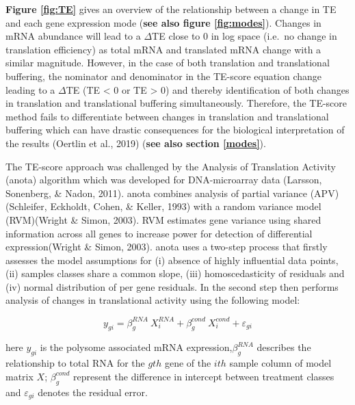 \documentclass[
  12pt,
  openany]{book}
\begin{document}
\textbf{Figure \ref{fig:TE}} gives an overview of the relationship between a change in TE and each gene expression mode (\textbf{see also figure \ref{fig:modes}}). Changes in mRNA abundance will lead to a \(\varDelta\)TE close to 0 in log space (i.e.~no change in translation efficiency) as total mRNA and translated mRNA change with a similar magnitude. However, in the case of both translation and translational buffering, the nominator and denominator in the TE-score equation change leading to a \(\varDelta\)TE (TE \textless{} 0 or TE \textgreater{} 0) and thereby identification of both changes in translation and translational buffering simultaneously. Therefore, the TE-score method fails to differentiate between changes in translation and translational buffering which can have drastic consequences for the biological interpretation of the results (Oertlin et al., 2019) (\textbf{see also section \ref{modes}}).

The TE-score approach was challenged by the Analysis of Translation Activity (anota) algorithm which was developed for DNA-microarray data (Larsson, Sonenberg, \& Nadon, 2011). anota combines analysis of partial variance (APV)(Schleifer, Eckholdt, Cohen, \& Keller, 1993) with a random variance model (RVM)(Wright \& Simon, 2003). RVM estimates gene variance using shared information across all genes to increase power for detection of differential expression(Wright \& Simon, 2003). anota uses a two-step process that firstly assesses the model assumptions for (i) absence of highly influential data points, (ii) samples classes share a common slope, (iii) homoscedasticity of residuals and (iv) normal distribution of per gene residuals. In the second step then performs analysis of changes in translational activity using the following model:

\[y_{gi} = \beta_g^{RNA}\ X_i^{RNA}+ \beta_g^{cond}\ X_i^{cond} + \varepsilon_{gi}\]

here \(y_{gi}\) is the polysome associated mRNA expression,\(\beta_g^{RNA}\) describes the relationship to total RNA for the \(gth\) gene of the \(ith\) sample column of model matrix \(X\); \(\beta_g^{cond}\) represent the difference in intercept between treatment classes and \(\varepsilon_{gi}\) denotes the residual error.
\end{document}
